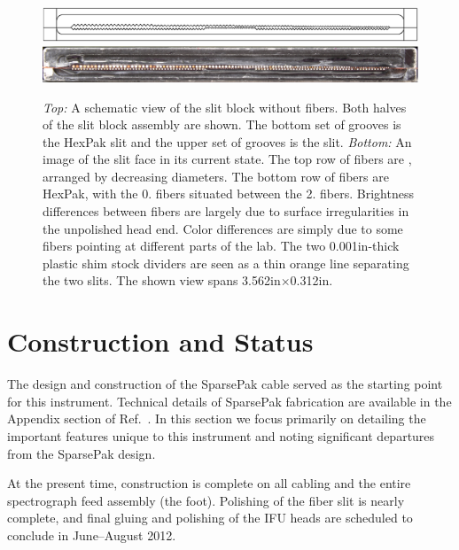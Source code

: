 \begin{figure}[t]
    \centering
    \includegraphics[width=\textwidth]{Pak_build/figs/slit}\\
    \vspace{2pt}
    \includegraphics[width=\textwidth]{Pak_build/figs/slit_img}
    \caption[HexPak/\GP slit]{\fixspacing \emph{Top:} A schematic view of the
      slit block without fibers.  Both halves of the slit block assembly are
      shown.  The bottom set of grooves is the HexPak slit and the upper set
      of grooves is the \GP slit.  \emph{Bottom:} An image of the slit
      face in its current state.  The top row of fibers are \GP, arranged
      by decreasing diameters.  The bottom row of fibers are HexPak, with the
      0. fibers situated between the 2. fibers.  Brightness
      differences between fibers are largely due to surface irregularities in
      the unpolished head end.  Color differences are simply due to some
      fibers pointing at different parts of the lab.  The two 0.001in-thick
      plastic shim stock dividers are seen as a thin orange line separating
      the two slits.  The shown view spans 3.562in$\times$0.312in.
    \label{fig:slit}}
\end{figure}


\section{Construction and Status} 
\label{GPB:sec:construction}

The design and construction of the SparsePak cable served as the starting
point for this instrument.  Technical details of SparsePak fabrication are
available in the Appendix section of Ref.~.  In this
section we focus primarily on detailing the important features unique to this
instrument and noting significant departures from the SparsePak design.


At the present time, construction is complete on all cabling and the entire
spectrograph feed assembly (the foot).  Polishing of the fiber slit is nearly
complete, and final gluing and polishing of the IFU heads are scheduled to
conclude in June--August 2012.

